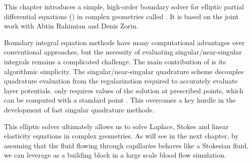 
This chapter introduces a simple, high-order boundary solver for elliptic partial differential equations (\pdes) in \threed complex geometries called \qbkix.
It is based on the joint work \cite{morse2020robust} with Abtin Rahimian and Denis Zorin.

Boundary integral equation methods have many computational advantages over conventional approaches, but the necessity of evaluating singular/near-singular integrals remains a complicated challenge.
The main contribution of \qbkix is its algorithmic simplicity.
The singular/near-singular quadrature scheme decouples quadrature evaluation from the regularization required to accurately evaluate layer potentials.
\qbkix only requires values of the solution at prescribed points, which can be computed with a standard point \fmm.
This overcomes a key hurdle in the development of fast singular quadrature methods.

This elliptic \pde solver ultimately allows us to solve Laplace, Stokes and linear elasticity equations in complex geometries.
As will see in the next chapter, by assuming that the fluid flowing through capillaries behaves like a Stokesian fluid, we can leverage \qbkix as a building block in a large scale blood flow simulation.








